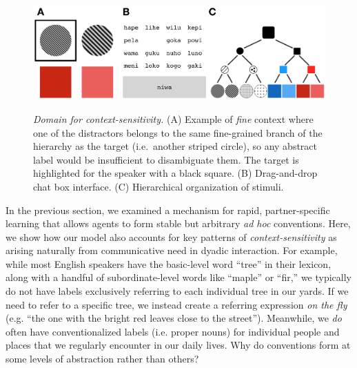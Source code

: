
\begin{figure}[t]
\begin{center}
{\includegraphics[scale=.63]{./figures/Sec2-design.png}}
{\caption{{\emph{Domain for context-sensitivity.} (A) Example of \emph{fine} context where one of the distractors belongs to the same fine-grained branch of the hierarchy as the target (i.e.\ another striped circle), so any abstract label would be insufficient to disambiguate them. The target is highlighted for the speaker with a black square. (B) Drag-and-drop chat box interface. (C) Hierarchical organization of stimuli.\label{fig:context_design}}}}
\vspace{-2ex}
\end{center}
\end{figure}

In the previous section, we examined a mechanism for rapid, partner-specific learning that allows agents to form stable but arbitrary \emph{ad hoc} conventions. 
Here, we show how our model also accounts for key patterns of \emph{context-sensitivity} as arising naturally from communicative need in dyadic interaction.
For example, while most English speakers have the basic-level word ``tree'' in their lexicon, along with a handful of subordinate-level words like ``maple'' or ``fir,'' we typically do not have labels exclusively referring to each individual tree in our yards.
If we need to refer to a specific tree, we instead create a referring expression \emph{on the fly} (e.g. ``the one with the bright red leaves close to the street'').
Meanwhile, we \emph{do} often have conventionalized labels (i.e. proper nouns) for individual people and places that we regularly encounter in our daily lives.
Why do conventions form at some levels of abstraction rather than others?

